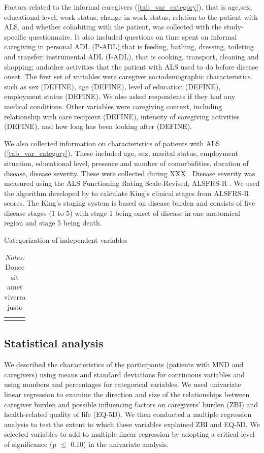 \documentclass[12pt]{article}
\begin{document}
Factors related to the informal caregivers (\autoref{tab_var_category}), that is age,sex, educational level, work status, change in work status, relation to the patient with ALS, and whether cohabiting with the patient, was collected with the study‐specific questionnaire. It also included questions on time spent on informal caregiving in personal ADL (P‐ADL),that is feeding, bathing, dressing, toileting and transfer; instrumental ADL (I‐ADL), that is cooking, transport, cleaning and shopping; andother activities that the patient with ALS used to do before disease onset. The first set of variables were caregiver sociodemographic characteristics.  such as sex (DEFINE), age (DEFINE), level of education (DEFINE), employment status (DEFINE). We also asked respondents if they had any medical conditions. Other variables were caregiving context, including relationship with care recipient (DEFINE), intensity of caregiving activities (DEFINE), and how long has been looking after (DEFINE).

We also collected information on characteristics of patients with ALS (\autoref{tab_var_category}). These included age, sex, marital status, employment situation, educational level, presence and number of comorbidities, duration of disease, disease severity. These were collected during XXX \parencite{gould_acceptance_2024}. Disease severity was measured using the ALS Functioning Rating Scale‐Revised, ALSFRS‐R \parencite{cedarbaum_alsfrs-r_1999}. We used the algorithm developed by \textcite{balendra_estimating_2014} to calculate King's clinical stages from ALSFRS-R scores. The King's staging system is based on disease burden and consists of five disease stages (1 to 5) with stage 1 being onset of disease in one anatomical region and stage 5 being death.

\hspace{1em}
\begin{table}[H]
    \centering \singlespacing \small
    \caption{Categorization of independent variables}
    \begin{tabular}{|L{6cm}|L{9cm}|}
        \hline
    \end{tabular}
    \label{tab_var_category}
    \caption*{\footnotesize \textit{Notes:} Donec sit amet viverra justo}
\end{table}


\subsection{Statistical analysis}
We described the characteristics of the participants (patients with MND and caregivers) using means and standard deviations for continuous variables and using numbers and percentages for categorical variables. We used univariate linear regression to examine the direction and size of the relationships between caregiver burden and possible influencing factors on  caregivers’ burden (ZBI) and health-related quality of life (EQ-5D). We then conducted a multiple regression analysis to test the extent to which these variables explained ZBI and EQ-5D. We selected variables to add to multiple linear regression by adopting a critical level of significance (p $\leq$ 0.10) in the univariate analysis.
\end{document}
